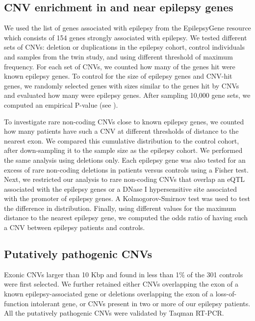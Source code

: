 \subsection*{CNV enrichment in and near epilepsy genes}
We used the list of genes associated with epilepsy from the EpilepsyGene resource\cite{Ran2015} which consists of 154 genes strongly associated with epilepsy.
We tested different sets of CNVs: deletion or duplications in the epilepsy cohort, control individuals and samples from the twin study, and using different threshold of maximum frequency.
For each set of CNVs, we counted how many of the genes hit were known epilepsy genes.
To control for the size of epilepsy genes and CNV-hit genes, we randomly selected genes with sizes similar to the genes hit by CNVs and evaluated how many were epilepsy genes.
After sampling 10,000 gene sets, we computed an empirical P-value (see ).

To investigate rare non-coding CNVs close to known epilepsy genes, we counted how many patients have such a CNV at different thresholds of distance to the nearest exon.
We compared this cumulative distribution to the control cohort, after down-sampling it to the sample size as the epilepsy cohort.
We performed the same analysis using deletions only.
Each epilepsy gene was also tested for an excess of rare non-coding deletions in patients versus controls using a Fisher test.
Next, we restricted our analysis to rare non-coding CNVs that overlap an eQTL associated with the epilepsy genes\cite{Ardlie2015} or a DNase I hypersensitive site associated with the promoter of epilepsy genes\cite{Maurano2012}.
A Kolmogorov-Smirnov test was used to test the difference in distribution.
Finally, using different values for the maximum distance to the nearest epilepsy gene, we computed the odds ratio of having such a CNV between epilepsy patients and controls.


\subsection*{Putatively pathogenic CNVs}
Exonic CNVs larger than 10 Kbp and found in less than 1\% of the 301 controls were first selected.
We further retained either CNVs overlapping the exon of a known epilepsy-associated gene\cite{Ran2015} or deletions overlapping the exon of a loss-of-function intolerant gene\cite{Lek2016}, or CNVs present in two or more of our epilepsy patients.
All the putatively pathogenic CNVs were validated by Taqman RT-PCR.

